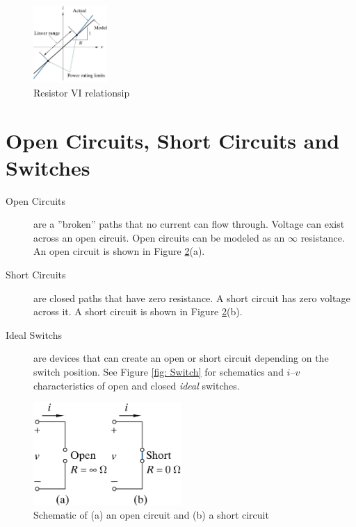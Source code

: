 \documentclass{handout}
\begin{document}
\begin{figure}[h b]
\centering
\includegraphics[width=0.25\textwidth]{Resistor_VI_Relationship.jpg}
\caption{Resistor VI relationsip}
\label{fig: Resistor_VI_Relationship}
\end{figure}

\section{Open Circuits, Short Circuits and Switches}
\begin{description}
\item [Open Circuits] are a ''broken'' paths that no current can flow through.  Voltage can exist across an open circuit.  Open circuits can be modeled as an $\infty$ resistance.  An open circuit is shown in Figure \ref{fig: Open_and_Short_Circuits}(a).
\item [Short Circuits] are closed paths that have zero resistance.  A short circuit has zero voltage across it. A short circuit is shown in Figure \ref{fig: Open_and_Short_Circuits}(b).
\item [Ideal Switchs] are devices that can create an open or short circuit depending on the switch position. See Figure \ref{fig: Switch} for schematics and  $i$--$v$ characteristics of open and closed {\em ideal} switches.
\end{description}

\begin{figure}[h b t]
\centering
\includegraphics[width=0.5\textwidth]{Open_and_Short_Circuits.jpg}
\caption{Schematic of (a) an open circuit and (b) a short circuit}
\label{fig: Open_and_Short_Circuits}
\end{figure}
\end{document}
